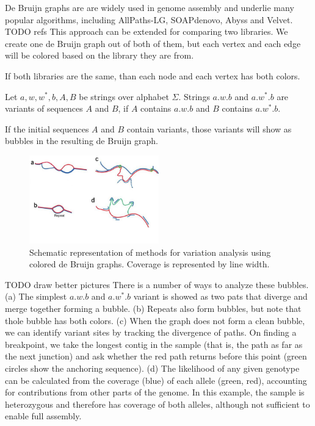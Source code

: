 De Bruijn graphs are are widely used in genome assembly and underlie many popular algorithms, including AllPaths-LG, SOAPdenovo, Abyss and Velvet. TODO refs
This approach can be extended for comparing two libraries. 
We create one de Bruijn graph out of both of them, but each vertex and each edge will be colored based on the library they are from.

If both libraries are the same, than each node and each vertex has both colors. 

\begin{definicia}[variant]
Let $a,w,w^*,b, A, B$ be strings over alphabet $\Sigma$.
Strings $a.w.b$ and $a.w^*.b$ are variants of sequences $A$ and $B$, 
if $A$ contains $a.w.b$ and $B$ contains $a.w^*.b$.
\end{definicia}

If the initial sequences $A$ and $B$ contain variants, 
those variants will show as bubbles\cite{iqbal2012novo} in the resulting de Bruijn graph.

\begin{figure}[h]
    \centering
    \includegraphics[width=0.5\textwidth]{images/coloreddebruijn}
    \caption{Schematic representation of methods for variation analysis using colored de Bruijn graphs. 
    Coverage is represented by line width.}
    \label{fig:mesh1}
\end{figure}


TODO draw better pictures
There is a number of ways to analyze these bubbles.
(a) The simplest $a.w.b$ and $a.w^*.b$ variant is showed as two pats that diverge and merge together forming a bubble.
(b) Repeats also form bubbles, but note that thole bubble has both colors.
(c) When the graph does not form a clean bubble, we can identify variant sites by tracking the divergence of paths.
On finding a breakpoint, we take the longest contig in the sample (that is, the path as far as the next junction) and ask whether the red path returns before this point (green circles show the anchoring sequence).
(d) The likelihood of any given genotype can be calculated from the coverage (blue) of each allele (green, red), accounting for contributions from other parts of the genome. In this example, the sample is heterozygous and therefore has coverage of both alleles, although not sufficient to enable full assembly.


